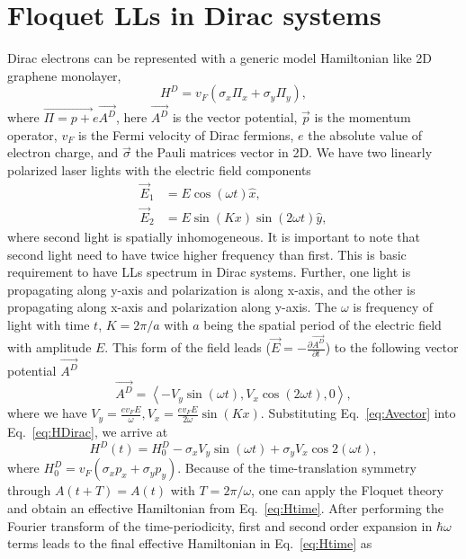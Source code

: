 \section{Floquet LLs in Dirac systems}
Dirac electrons can be represented with a generic model Hamiltonian like 2D graphene monolayer,
\begin{equation}\label{eq:HDirac}
	H^D=v_F(\sigma _{x}\Pi _{x}+\sigma _{y}\Pi _{y}),
\end{equation}%
where $\vec{\Pi =p+}e\vec{A^D}$, here $\vec{A^D}$ is the vector
potential, $\vec{p}$ is the momentum operator, $v_F$ is the Fermi
velocity of Dirac fermions, $e$ the absolute value of electron charge,
and $\vec{\sigma}$ the Pauli matrices vector in 2D. We have two linearly polarized laser lights with the electric field components
\begin{align} \label{eq:Efield}
\vec{E}_{1} &= E\cos (\omega t)\hat{x}, \nonumber \\
\vec{E}_{2} &= E\sin(Kx)\sin (2\omega t)\hat{y},
\end{align}%
where second light is spatially inhomogeneous. It is important to note that second light need to have twice higher frequency than first. This is basic requirement to have LLs spectrum in Dirac systems. Further, one light is propagating along y-axis and polarization is along x-axis, and the other is propagating along x-axis and polarization along y-axis. The $\omega $ is frequency of light with time $t$, $%
K=2\pi /a$ with $a$ being the spatial period of the electric field with
amplitude $E$. This form of the field leads ($\vec{E}=-\frac{\partial \vec{A^D}}{\partial t}$) to the following vector potential $\vec{A^D}$
\begin{equation}\label{eq:Avector}
\vec{A^D}=\left\langle -V_y\sin (\omega t), V_x \cos (2\omega t),0 \right\rangle,
\end{equation}%
where we have $V_{y}=\frac{ev_FE}{\omega },V_{x}=\frac{ev_FE}{2\omega }\sin(Kx)$. Substituting Eq.~\eqref{eq:Avector} into Eq.~\eqref{eq:HDirac}, we arrive at%
\begin{equation}\label{eq:Htime}
H^D(t)=H_{0}^D- \sigma _{x}V_{y}\sin (\omega t)+\sigma _{y}V_{x}\cos 2(\omega
t),
\end{equation}%
where $H_{0}^D=v_F(\sigma _{x} p_{x}+\sigma_{y} p_{y})$. Because of the time-translation symmetry through $A(t+T)=A(t)$ with $T=2\pi /\omega $, one can apply the Floquet theory \cite{AEE, MBL, supp} and obtain an effective Hamiltonian from Eq.~\eqref{eq:Htime}. After performing the Fourier transform of the time-periodicity, first and second order expansion in $\hbar\omega$ terms leads to the final effective Hamiltonian in Eq.~\eqref{eq:Htime} as
